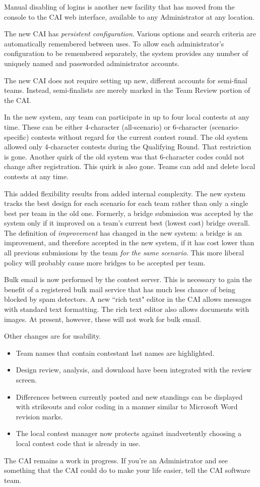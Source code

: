 \documentclass[11pt,letterpaper]{refart}
\begin{document}
Manual disabling of logins is another new facility that
has moved from the console to the CAI web interface, available to any Administrator
at any location.

The new CAI has \emph{persistent configuration}. Various options and
search criteria are automatically remembered between uses.  To allow each 
administrator's configuration
to be remembered separately, the system provides any number of uniquely named and
passworded administrator accounts.

The new CAI does not require setting up new, different accounts for semi-final teams. 
Instead, semi-finalists are merely marked in the Team Review portion of the CAI.  

In the new system, any team can participate in up to four local contests at any time.
These can be either 
4-character (all-scenario) or 6-character (scenario-specific) contests without regard for the 
current contest round. The old system allowed only 4-character contests 
during the Qualifying Round. That restriction is gone.  Another quirk of the 
old system was that 6-character codes could not change after registration.  This quirk is 
also gone. Teams can add and delete local contests at any time. 

This added flexibility results from added internal complexity. The new system tracks the  
best  design for each scenario for each team rather than only a single best per team in 
the old one.  Formerly, a bridge submission was accepted by the system only if 
it improved on a team's current best (lowest cost) bridge overall.  The definition of 
\emph{improvement} has changed in the new system: a bridge is an improvement, and 
therefore accepted in the new system, if it has cost
lower than all previous submissions by the team \emph{for the same scenario}.  This
more liberal policy will probably cause more bridges to be accepted per team. 

Bulk email is now performed by the contest server. This is necessary to gain the benefit of
a registered bulk mail service that has much less chance of being blocked by spam detectors.
A new ``rich text" editor in the CAI allows messages with standard text formatting.
The rich text editor also allows documents with images.  At present, however, these will
not work for bulk email.

Other changes are for usability. 
\begin{itemize}
\item Team names that contain contestant last names are highlighted.
\item Design review, analysis, and download have been integrated with the review screen. 
\item Differences between currently posted and new standings can be displayed with 
  strikeouts and color coding in a manner similar to Microsoft Word revision marks. 
\item The local contest manager now protects against inadvertently choosing a local 
  contest code that is already in use.
\end{itemize}
The CAI remains a work in progress. If you're an Administrator and see something
that the CAI could do to make your life easier, tell the CAI software team.
\end{document}
